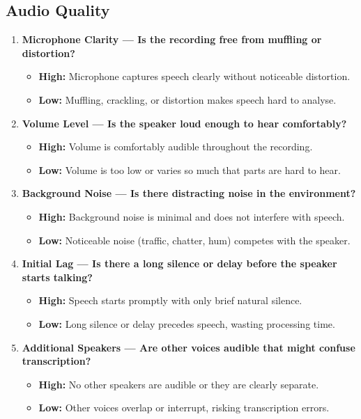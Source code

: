 \documentclass{report}
\begin{document}
\subsection*{Audio Quality}
\begin{enumerate}
  \item \textbf{Microphone Clarity — Is the recording free from muffling or distortion?}
  \begin{itemize}
    \item \textbf{High:} Microphone captures speech clearly without noticeable distortion.
    \item \textbf{Low:} Muffling, crackling, or distortion makes speech hard to analyse.
  \end{itemize}

  \item \textbf{Volume Level — Is the speaker loud enough to hear comfortably?}
  \begin{itemize}
    \item \textbf{High:} Volume is comfortably audible throughout the recording.
    \item \textbf{Low:} Volume is too low or varies so much that parts are hard to hear.
  \end{itemize}

  \item \textbf{Background Noise — Is there distracting noise in the environment?}
  \begin{itemize}
    \item \textbf{High:} Background noise is minimal and does not interfere with speech.
    \item \textbf{Low:} Noticeable noise (traffic, chatter, hum) competes with the speaker.
  \end{itemize}

  \item \textbf{Initial Lag — Is there a long silence or delay before the speaker starts talking?}
  \begin{itemize}
    \item \textbf{High:} Speech starts promptly with only brief natural silence.
    \item \textbf{Low:} Long silence or delay precedes speech, wasting processing time.
  \end{itemize}

  \item \textbf{Additional Speakers — Are other voices audible that might confuse transcription?}
  \begin{itemize}
    \item \textbf{High:} No other speakers are audible or they are clearly separate.
    \item \textbf{Low:} Other voices overlap or interrupt, risking transcription errors.
  \end{itemize}


\end{enumerate}
\end{document}
